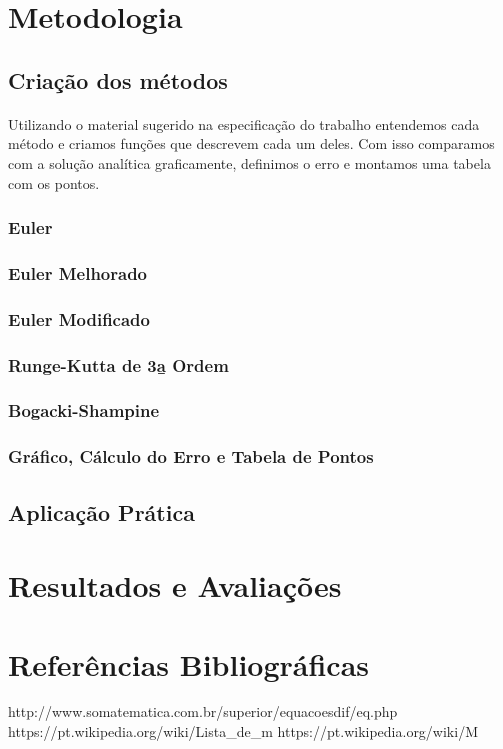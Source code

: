 \documentclass{article}
\begin{document}
\newpage
\section{Metodologia}
	\subsection{Cria\c c\~ao dos m\'etodos}
\paragraph{}Utilizando o material sugerido na especifica\c c\~ao do trabalho entendemos cada m\'etodo e criamos fun\c c\~oes que descrevem cada um deles. Com isso 
comparamos com a solu\c c\~ao anal\'itica graficamente, definimos o erro e montamos uma tabela com os pontos.
		\subsubsection{Euler}
		\subsubsection{Euler Melhorado}
		\subsubsection{Euler Modificado}
		\subsubsection{Runge-Kutta de 3\b a Ordem}
		\subsubsection{Bogacki-Shampine}
		\subsubsection{Gr\'afico, C\'alculo do Erro e Tabela de Pontos}
	\subsection{Aplica\c c\~ao Pr\'atica}
\newpage
\section{Resultados e Avalia\c c\~oes}
\newpage
\section{Refer\^encias Bibliogr\'aficas}
http://www.somatematica.com.br/superior/equacoesdif/eq.php
https://pt.wikipedia.org/wiki/Lista_de_m%
https://pt.wikipedia.org/wiki/M%
\end{document}
